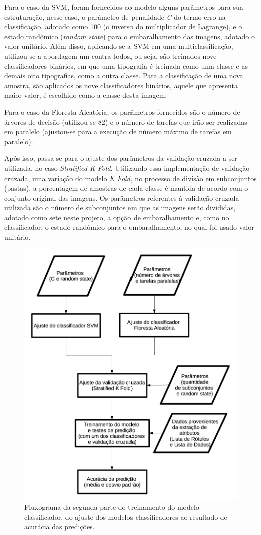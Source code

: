 Para o caso da SVM, foram fornecidos ao modelo alguns parâmetros para sua estruturação, nesse caso, o parâmetro de penalidade \textit{C} do termo erro na classificação, adotado como 100 (o inverso do multiplicador de Lagrange), e o estado randômico (\textit{random state}) para o embaralhamento das imagens, adotado o valor unitário. Além disso, aplicando-se a SVM em uma multiclassificação, utilizou-se a abordagem um-contra-todos, ou seja, são treinados nove classificadores binários, em que uma tipografia é treinada como uma classe e as demais oito tipografias, como a outra classe. Para a classificação de uma nova amostra, são aplicados os nove classificadores binários, aquele que apresenta maior valor, é escolhido como a classe desta imagem.

Para o caso da Floresta Aleatória, os parâmetros fornecidos são o número de árvores de decisão (utilizou-se 82) e o número de tarefas que irão ser realizadas em paralelo (ajustou-se para a execução de número máximo de tarefas em paralelo).

Após isso, passa-se para o ajuste dos parâmetros da validação cruzada a ser utilizada, no caso \textit{Stratified K Fold}. Utilizando essa implementação de validação cruzada, uma variação do modelo \textit{K Fold},  no processo de divisão em subconjuntos (pastas), a porcentagem de amostras de cada classe é mantida de acordo com o conjunto original das imagens. Os parâmetros referentes à validação cruzada utilizada são o número de subconjuntos em que as imagens serão divididas, adotado como sete neste projeto, a opção de embaralhamento e, como no classificador, o estado randômico para o embaralhamento, no qual foi usado valor unitário.

\begin{figure}[H]
 \centering
  \includegraphics[width=0.6\linewidth]{figuras/treinamento2.pdf}
  \caption{Fluxograma da segunda parte do treinamento do modelo classificador, do ajuste dos modelos classificadores ao resultado de acurácia das predições.}
  \label{fig:flowtreinamento2}
\end{figure}

